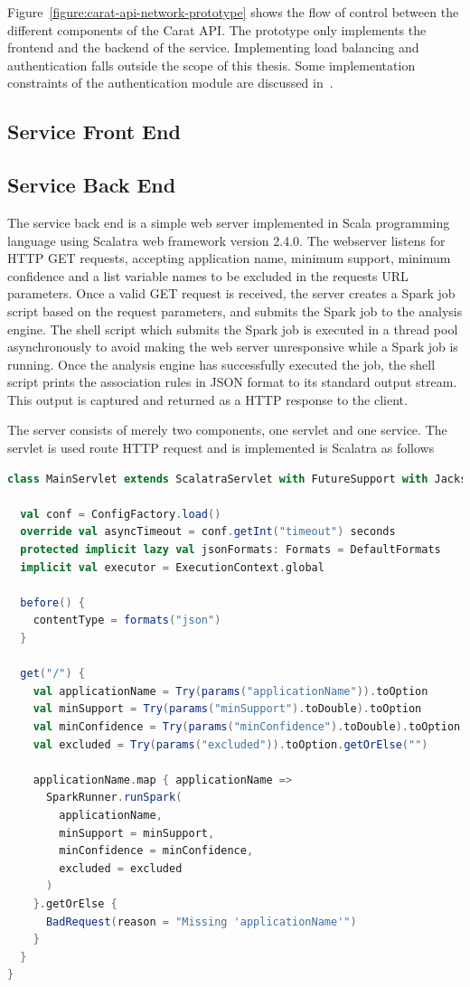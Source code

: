 Figure~\ref{figure:carat-api-network-prototype} shows the flow of control between the different components of the Carat API. The prototype only implements the frontend and the backend of the service. Implementing load balancing and authentication falls outside the scope of this thesis. Some implementation constraints of the authentication module are discussed in~\cite{7840871}.     

\subsection{Service Front End}

\subsection{Service Back End}

The service back end is a simple web server implemented in Scala programming language using Scalatra web framework version 2.4.0. The webserver listens for HTTP GET requests, accepting application name, minimum support, minimum confidence and a list variable names to be excluded in the requests URL parameters. Once a valid GET request is received, the server creates a Spark job script based on the request parameters, and submits the Spark job to the analysis engine. The shell script which submits the Spark job is executed in a thread pool asynchronously to avoid making the web server unresponsive while a Spark job is running. Once the analysis engine has successfully executed the job, the shell script prints the association rules in JSON format to its standard output stream. This output is captured and returned as a HTTP response to the client.

The server consists of merely two components, one servlet and one service. The servlet is used route HTTP request and is implemented is Scalatra as follows

\begin{minipage}{\linewidth}
\begin{lstlisting}[language=scala]
class MainServlet extends ScalatraServlet with FutureSupport with JacksonJsonSupport {

  val conf = ConfigFactory.load()
  override val asyncTimeout = conf.getInt("timeout") seconds
  protected implicit lazy val jsonFormats: Formats = DefaultFormats
  implicit val executor = ExecutionContext.global
  
  before() {
    contentType = formats("json")
  }
	
  get("/") {
    val applicationName = Try(params("applicationName")).toOption
	val minSupport = Try(params("minSupport").toDouble).toOption
	val minConfidence = Try(params("minConfidence").toDouble).toOption
    val excluded = Try(params("excluded")).toOption.getOrElse("")

    applicationName.map { applicationName =>
      SparkRunner.runSpark(
        applicationName,
        minSupport = minSupport,
        minConfidence = minConfidence,
        excluded = excluded
      )
    }.getOrElse {
      BadRequest(reason = "Missing 'applicationName'")
    }
  }
}
\end{lstlisting}
\end{minipage}  

